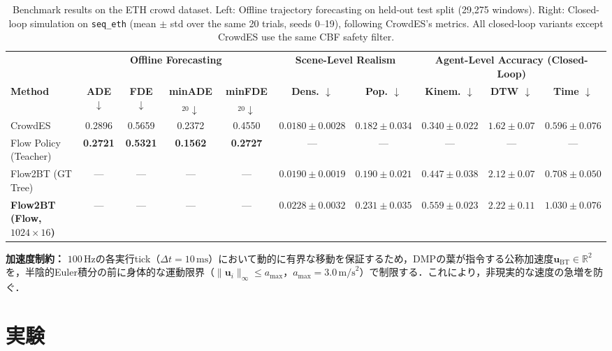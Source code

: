\documentclass{sice-si}
\begin{document}
\begin{table}[t]
\centering
\caption{Benchmark results on the ETH crowd dataset. Left: Offline trajectory forecasting on held-out test split (29,275 windows). Right: Closed-loop simulation on \texttt{seq\_eth} (mean $\pm$ std over the same 20 trials, seeds 0--19), following CrowdES's metrics. All closed-loop variants except CrowdES use the same CBF safety filter.}
\label{tab:benchmark}
\footnotesize
\setlength{\tabcolsep}{2.5pt}
\begin{tabular}{lcccc|cc|ccc}
\hline
& \multicolumn{4}{c|}{\textbf{Offline Forecasting}} & \multicolumn{2}{c|}{\textbf{Scene-Level Realism}} & \multicolumn{3}{c}{\textbf{Agent-Level Accuracy (Closed-Loop)}} \\
\textbf{Method} & \textbf{ADE $\downarrow$} & \textbf{FDE $\downarrow$} & \textbf{minADE$_{20} \downarrow$} & \textbf{minFDE$_{20} \downarrow$} & \textbf{Dens. $\downarrow$} & \textbf{Pop. $\downarrow$} & \textbf{Kinem. $\downarrow$} & \textbf{DTW $\downarrow$} & \textbf{Time $\downarrow$} \\
\hline
CrowdES~\cite{bae2025crowdes} & 0.2896 & 0.5659 & 0.2372 & 0.4550 & $\mathbf{0.0180} \pm 0.0028$ & $\mathbf{0.182} \pm 0.034$ & $\mathbf{0.340} \pm 0.022$ & $\mathbf{1.62} \pm 0.07$ & $\mathbf{0.596} \pm 0.076$ \\
Flow Policy (Teacher) & \textbf{0.2721} & \textbf{0.5321} & \textbf{0.1562} & \textbf{0.2727} & — & — & — & — & — \\
\hline
Flow2BT (GT Tree) & — & — & — & — & $0.0190 \pm 0.0019$ & $0.190 \pm 0.021$ & $0.447 \pm 0.038$ & $2.12 \pm 0.07$ & $0.708 \pm 0.050$ \\
\textbf{Flow2BT (Flow, $1024 \times 16$)} & — & — & — & — & $0.0228 \pm 0.0032$ & $0.231 \pm 0.035$ & $0.559 \pm 0.023$ & $2.22 \pm 0.11$ & $1.030 \pm 0.076$ \\
\hline
\end{tabular}
\end{table}

\textbf{加速度制約：}
$100\,\text{Hz}$の各実行tick（$\Delta t = 10\,\text{ms}$）において動的に有界な移動を保証するため，DMPの葉が指令する公称加速度$\mathbf{u}_{\text{BT}} \in \mathbb{R}^2$を，半陰的Euler積分の前に身体的な運動限界（$\|\mathbf{u}_i\|_\infty \le a_{\max}$，$a_{\max} = 3.0\,\text{m/s}^2$）で制限する．これにより，非現実的な速度の急増を防ぐ．

\section{実験}
\end{document}
